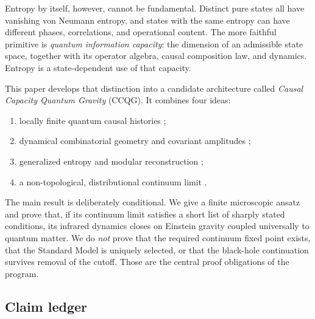 \documentclass[11pt]{article}
\theoremstyle{remark}
\begin{document}
Entropy by itself, however, cannot be fundamental.  Distinct pure states
all have vanishing von Neumann entropy, and states with the same entropy
can have different phases, correlations, and operational content.  The
more faithful primitive is \emph{quantum information capacity}: the
dimension of an admissible state space, together with its operator
algebra, causal composition law, and dynamics.  Entropy is a
state-dependent use of that capacity.

This paper develops that distinction into a candidate architecture called
\emph{Causal Capacity Quantum Gravity} (CCQG).  It combines four ideas:
\begin{enumerate}[label=(\roman*)]
  \item locally finite quantum causal histories
  \cite{Markopoulou2000,Hawkins2003};
  \item dynamical combinatorial geometry and covariant amplitudes
  \cite{Regge1961,RovelliVidotto2015};
  \item generalized entropy and modular reconstruction
  \cite{Jacobson2015,JLMS2016,ADH2015};
  \item a non-topological, distributional continuum limit
  \cite{Bruno2026}.
\end{enumerate}

The main result is deliberately conditional.  We give a finite
microscopic ansatz and prove that, if its continuum limit satisfies a
short list of sharply stated conditions, its infrared dynamics closes on
Einstein gravity coupled universally to quantum matter.  We do
\emph{not} prove that the required continuum fixed point exists, that the
Standard Model is uniquely selected, or that the black-hole continuation
survives removal of the cutoff.  Those are the central proof obligations
of the program.

\subsection{Claim ledger}
\end{document}
